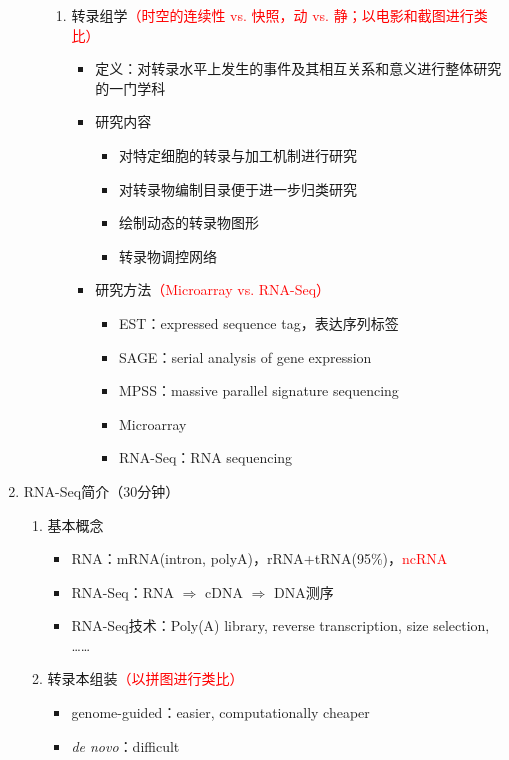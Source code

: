 \documentclass{TIJMUjiaoanLL}
\begin{document}
\begin{enumerate}
\begin{enumerate}
\begin{enumerate}
          \item 转录组学\textcolor{red}{（时空的连续性 vs. 快照，动 vs. 静；以电影和截图进行类比）}
            \begin{itemize}
              \item 定义：对转录水平上发生的事件及其相互关系和意义进行整体研究的一门学科
              \item 研究内容
                \begin{itemize}
                  \item 对特定细胞的转录与加工机制进行研究
                  \item 对转录物编制目录便于进一步归类研究
                  \item 绘制动态的转录物图形
                  \item 转录物调控网络
                \end{itemize}
              \item 研究方法\textcolor{red}{（Microarray vs. RNA-Seq）}
                \begin{itemize}
                  \item EST：expressed sequence tag，表达序列标签
                  \item SAGE：serial analysis of gene expression
                  \item MPSS：massive parallel signature sequencing
                  \item Microarray
                  \item RNA-Seq：RNA sequencing
                \end{itemize}
            \end{itemize}
        \end{enumerate}
    \end{enumerate}

  \item RNA-Seq简介（30分钟）
    \begin{enumerate}
      \item 基本概念
        \begin{itemize}
          \item RNA：mRNA(intron, polyA)，rRNA+tRNA(95\%)，\textcolor{red}{ncRNA}
          \item RNA-Seq：RNA $\Rightarrow$ cDNA $\Rightarrow$ DNA测序
          \item RNA-Seq技术：Poly(A) library, reverse transcription, size selection, ……
        \end{itemize}
      \item 转录本组装\textcolor{red}{（以拼图进行类比）}
        \begin{itemize}
          \item genome-guided：easier, computationally cheaper
          \item \textit{de novo}：difficult
        \end{itemize}


\end{enumerate}
\end{enumerate}
\end{document}
